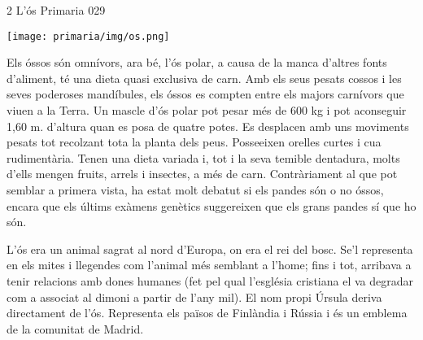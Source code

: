 \newssep
{}

\begin{news}
{2} %
{L'ós}
{}
{Primaria}
{029} %

\noindent\texttt{[image: primaria/img/os.png]}

Els óssos són omnívors, ara bé, l'ós polar, a causa de la manca d'altres fonts d'aliment, té una dieta quasi exclusiva de carn. Amb els seus pesats cossos i les seves poderoses mandíbules, els óssos es compten entre els majors carnívors que viuen a la Terra. Un mascle d'ós polar pot pesar més de 600 kg i pot aconseguir 1,60 m. d'altura quan es posa de quatre potes. Es desplacen amb uns moviments pesats tot  recolzant tota la planta dels peus. Posseeixen orelles curtes i cua rudimentària. Tenen una dieta variada i, tot i la seva temible dentadura, molts d'ells mengen fruits, arrels i insectes, a més de carn. 
Contràriament al que pot semblar a primera vista, ha estat molt debatut si els pandes són o no óssos, encara que els últims exàmens genètics suggereixen que els grans pandes sí que ho són.


L'ós era un animal sagrat al nord d'Europa, on era el rei del bosc. Se'l representa en els mites i llegendes com l'animal més semblant a l’home; fins i tot, arribava a tenir relacions amb dones humanes (fet pel qual l'església cristiana el va degradar com a associat al dimoni a partir de l'any mil). El nom propi Úrsula deriva directament de l'ós. Representa els països de Finlàndia i Rússia i és un emblema de la comunitat de Madrid.





\end{news}

